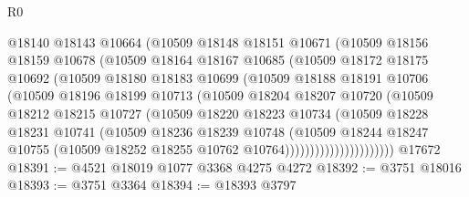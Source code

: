 \begin{lexlean}{R0}
\begin{coremodule}
                    @18140
                    @18143
                    @10664
                    (@10509
                      @18148
                      @18151
                      @10671
                      (@10509
                        @18156
                        @18159
                        @10678
                        (@10509
                          @18164
                          @18167
                          @10685
                          (@10509
                            @18172
                            @18175
                            @10692
                            (@10509
                              @18180
                              @18183
                              @10699
                              (@10509
                                @18188
                                @18191
                                @10706
                                (@10509
                                  @18196
                                  @18199
                                  @10713
                                  (@10509
                                    @18204
                                    @18207
                                    @10720
                                    (@10509
                                      @18212
                                      @18215
                                      @10727
                                      (@10509
                                        @18220
                                        @18223
                                        @10734
                                        (@10509
                                          @18228
                                          @18231
                                          @10741
                                          (@10509
                                            @18236
                                            @18239
                                            @10748
                                            (@10509
                                              @18244
                                              @18247
                                              @10755
                                              (@10509
                                                @18252
                                                @18255
                                                @10762
                                                @10764))))))))))))))))))))))
    @17672
@18391 := @4521 @18019 @1077 @3368 @4275 @4272
@18392 := @3751 @18016
@18393 := @3751 @3364
@18394 := @18393 @3797

\end{coremodule}
\end{lexlean}
